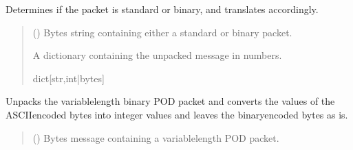 \documentclass[letterpaper,10pt,english]{sphinxmanual}
\begin{document}
\begin{fulllineitems}
\begin{fulllineitems}
\end{fulllineitems}


\begin{fulllineitems}
\label{\detokenize{BasicPodProtocol:BasicPodProtocol.POD_Basics.TranslatePODpacket}}
\pysigstartsignatures
{}
\pysigstopsignatures
\sphinxAtStartPar
Determines if the packet is standard or binary, and translates accordingly.
\begin{quote}\begin{description}
\sphinxAtStartPar
{} () \textendash{} Bytes string containing either a standard or binary packet.

\sphinxAtStartPar
A dictionary containing the unpacked message in numbers.

\sphinxAtStartPar
dict{[}str,int|bytes{]}

\end{description}\end{quote}

\end{fulllineitems}


\begin{fulllineitems}
\label{\detokenize{BasicPodProtocol:BasicPodProtocol.POD_Basics.TranslatePODpacket_Binary}}
\pysigstartsignatures
{}
\pysigstopsignatures
\sphinxAtStartPar
Unpacks the variable\sphinxhyphen{}length binary POD packet and converts the values of the ASCII\sphinxhyphen{}encoded
bytes into integer values and leaves the binary\sphinxhyphen{}encoded bytes as is.
\begin{quote}\begin{description}
\sphinxAtStartPar
{} () \textendash{} Bytes message containing a variable\sphinxhyphen{}length POD packet.


\end{description}
\end{quote}
\end{fulllineitems}
\end{fulllineitems}
\end{document}
